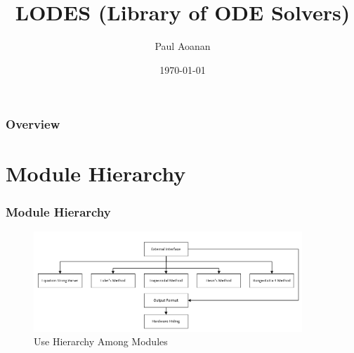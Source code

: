 \documentclass{beamer}
\title[LODES]{LODES (Library of ODE Solvers)} %
\author{Paul Aoanan} %
\institute[McMaster University] %
{
CAS 741\\
McMaster University \\ %
\medskip
}
\date{\today} %
\begin{document}
\begin{frame}
\titlepage %
\end{frame}

\begin{frame}
\frametitle{Overview} %
\tableofcontents %
\end{frame}


\section{Module Hierarchy} %


\begin{frame}
\frametitle{Module Hierarchy}

\begin{figure}[H]
\centering
\includegraphics[width=0.9\textwidth]{use.png}
\caption{Use Hierarchy Among Modules}
\label{FigUH}
\end{figure}

\end{frame}
\end{document}
